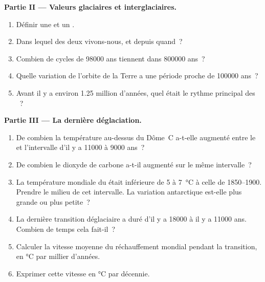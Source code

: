 \begin{problem}
\medskip
\noindent\textbf{Partie II --- Valeurs glaciaires et interglaciaires.}
\begin{enumerate}[resume]
  \item Définir une  et un .
  \item Dans lequel des deux vivons-nous, et depuis quand~?
  \item Combien de cycles de \num{98000} ans tiennent dans \num{800000}
        ans~?
  \item Quelle variation de l'orbite de la Terre a une période proche de
        \num{100000} ans~?
  \item Avant il y a environ 1.25 million d'années, quel était le rythme
        principal des ~?
\end{enumerate}

\medskip
\noindent\textbf{Partie III --- La dernière déglaciation.}
\begin{enumerate}[resume]
  \item De combien la température au-dessus du Dôme~C a-t-elle augmenté
        entre le  et l'intervalle d'il y a
        \num{11000} à \num{9000} ans~?
  \item De combien le dioxyde de carbone a-t-il augmenté sur le même
        intervalle~?
  \item La température mondiale du  était
        inférieure de 5 à \qty{7}{\degreeCelsius} à celle de 1850--1900.
        Prendre le milieu de cet intervalle. La variation antarctique
        est-elle plus grande ou plus petite~?
  \item La dernière transition déglaciaire a duré d'il y a \num{18000} à
        il y a \num{11000} ans. Combien de temps cela fait-il~?
  \item Calculer la vitesse moyenne du réchauffement mondial pendant la
        transition, en \unit{\degreeCelsius} par millier d'années.
  \item Exprimer cette vitesse en \unit{\degreeCelsius} par décennie.
\end{enumerate}


\end{problem}
